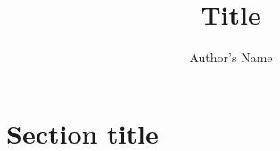 

\title{Title}
\author{Author's Name}
\note{\today}



\maketitle


\section{Section title}
\lipsum[1-10] 

\printbibliography


